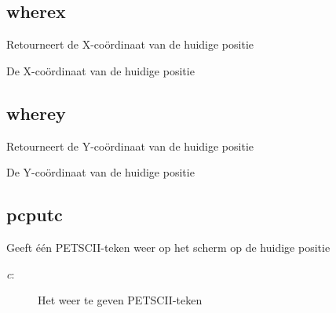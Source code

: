 \subsection{wherex}
\begin{description}[leftmargin=2.4cm,style=nextline]
\item [Beschrijving:] {Retourneert de X-coördinaat van de huidige positie}\item [Syntaxis:] \item [Resultaat:] {De X-coördinaat van de huidige positie}
\end{description}

\subsection{wherey}
\begin{description}[leftmargin=2.4cm,style=nextline]
\item [Beschrijving:] {Retourneert de Y-coördinaat van de huidige positie}\item [Syntaxis:] \item [Resultaat:] {De Y-coördinaat van de huidige positie}
\end{description}

\subsection{pcputc}
\begin{description}[leftmargin=2.4cm,style=nextline]
\item [Beschrijving:] {Geeft één PETSCII-teken weer op het scherm op   de huidige positie}\item [Syntaxis:] \item [Parameters:]
\begin{description}
\item [{\em c}:] {Het weer te geven PETSCII-teken}
\end{description}
\end{description}

